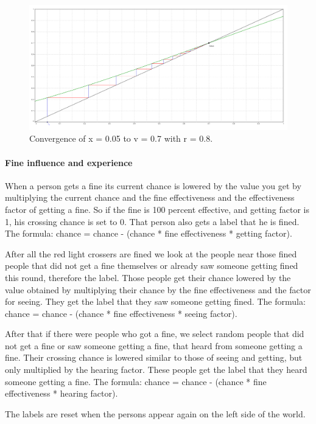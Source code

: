 \documentclass[a4paper]{article}
\begin{document}
\begin{figure}[H]
\centering
\includegraphics[width=.9\textwidth]{iteration2.png}
\caption{Convergence of x = 0.05 to v = 0.7 with r = 0.8.}
\label{ABlabel}
\end{figure}

\paragraph{Fine influence and experience}
When a person gets a fine its current chance is lowered by the value you get by multiplying the current chance and the fine effectiveness and the effectiveness factor of getting a fine. So if the fine is 100 percent effective, and getting factor is 1, his crossing chance is set to 0. That person also gets a label that he is fined.  The formula: chance = chance - (chance * fine effectiveness * getting factor).

After all the red light crossers are fined we look at the people near those fined people that did not get a fine themselves or already saw someone getting fined this round, therefore the label. Those people get their chance lowered by the value obtained by multiplying their chance by the fine effectiveness and the factor for seeing. They get the label that they saw someone getting fined. The formula: chance = chance - (chance * fine effectiveness * seeing factor).

After that if there were people who got a fine, we select random people that did not get a fine or saw someone getting a fine, that heard from someone getting a fine. Their crossing chance is lowered similar to those of seeing and getting, but only multiplied by the hearing factor. These people get the label that they heard someone getting a fine. The formula: chance = chance - (chance * fine effectiveness * hearing factor).

The labels are reset when the persons appear again on the left side of the world. 
\end{document}
